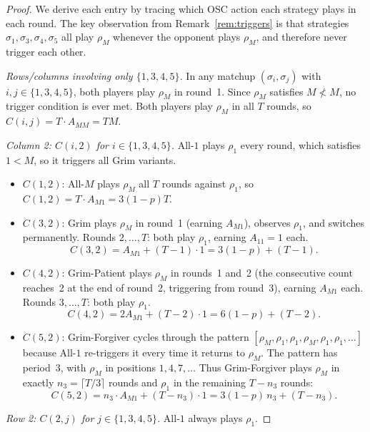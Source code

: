 \documentclass[12pt,a4paper]{article}
\begin{document}
\begin{proof}
We derive each entry by tracing which OSC action each strategy plays in each
round.  The key observation from Remark~\ref{rem:triggers} is that strategies
$\sigma_1, \sigma_3, \sigma_4, \sigma_5$ all play $\rho_M$ whenever the
opponent plays $\rho_M$, and therefore never trigger each other.

\medskip\noindent
\textit{Rows/columns involving only $\{1,3,4,5\}$.}
In any matchup $(\sigma_i, \sigma_j)$ with $i,j\in\{1,3,4,5\}$, both players
play $\rho_M$ in round~1.  Since $\rho_M$ satisfies $M\not<M$, no trigger
condition is ever met.  Both players play $\rho_M$ in all $T$ rounds, so
$C(i,j) = T\cdot A_{MM} = TM$.

\medskip\noindent
\textit{Column 2: $C(i,2)$ for $i\in\{1,3,4,5\}$.}
All-$1$ plays $\rho_1$ every round, which satisfies $1<M$, so it triggers all
Grim variants.

\begin{itemize}
\item $C(1,2)$: All-$M$ plays $\rho_M$ all $T$ rounds against $\rho_1$, so
  $C(1,2) = T\cdot A_{M1} = 3(1-p)T$.

\item $C(3,2)$: Grim plays $\rho_M$ in round~1 (earning $A_{M1}$), observes
  $\rho_1$, and switches permanently.  Rounds $2,\ldots,T$: both play $\rho_1$,
  earning $A_{11}=1$ each.
  \[C(3,2) = A_{M1} + (T-1)\cdot 1 = 3(1-p) + (T-1).\]

\item $C(4,2)$: Grim-Patient plays $\rho_M$ in rounds~1 and~2 (the consecutive
  count reaches~2 at the end of round~2, triggering from round~3), earning
  $A_{M1}$ each.  Rounds $3,\ldots,T$: both play $\rho_1$.
  \[C(4,2) = 2A_{M1} + (T-2)\cdot 1 = 6(1-p) + (T-2).\]

\item $C(5,2)$: Grim-Forgiver cycles through the pattern
  $[\rho_M, \rho_1, \rho_1, \rho_M, \rho_1, \rho_1, \ldots]$ because All-$1$
  re-triggers it every time it returns to $\rho_M$.  The pattern has period~3,
  with $\rho_M$ in positions $1, 4, 7, \ldots$
  Thus Grim-Forgiver plays $\rho_M$ in exactly $n_3 = \lceil T/3\rceil$ rounds
  and $\rho_1$ in the remaining $T - n_3$ rounds:
  \[C(5,2) = n_3\cdot A_{M1} + (T-n_3)\cdot 1 = 3(1-p)\,n_3 + (T-n_3).\]
\end{itemize}

\medskip\noindent
\textit{Row 2: $C(2,j)$ for $j\in\{1,3,4,5\}$.}
All-$1$ always plays $\rho_1$.


\end{proof}
\end{document}

